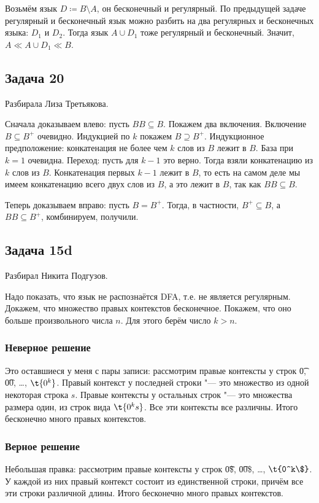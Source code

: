 	Возьмём язык $D \coloneq B \setminus A$, он бесконечный и регулярный.
	По предыдущей задаче регулярный и бесконечный язык можно разбить на два регулярных и бесконечных языка: $D_1$ и $D_2$.
	Тогда язык $A \cup D_1$ тоже регулярный и бесконечный.
	Значит, $A \ll A \cup D_1 \ll B$.

\subsection{Задача 20}
	Разбирала Лиза Третьякова.

	Сначала доказываем влево: пусть $BB\subseteq B$.
	Покажем два включения.
	Включение $B\subseteq B^{+}$ очевидно.
	Индукцией по $k$ покажем $B\supseteq B^{+}$.
	Индукционное предположение: конкатенация не более чем $k$ слов из $B$ лежит в $B$.
	База при $k=1$ очевидна.
	Переход: пусть для $k-1$ это верно.
	Тогда взяли конкатенацию из $k$ слов из $B$.
	Конкатенация первых $k-1$ лежит в $B$, то есть на самом деле мы имеем конкатенацию всего
	двух слов из $B$, а это лежит в $B$, так как $BB\subseteq B$.

	Теперь доказываем вправо: пусть $B=B^{+}$.
	Тогда, в частности, $B^{+} \subseteq B$, а $BB \subseteq B^{+}$, комбинируем, получили.

\subsection{Задача 15d}
	Разбирал Никита Подгузов.

	Надо показать, что язык не распознаётся DFA, т.е. не является регулярным.
	Докажем, что множество правых контекстов бесконечное.
	Покажем, что оно больше произвольного числа $n$.
	Для этого берём число $k>n$.
	\subsubsection{Неверное решение}
		Это оставшиеся у меня с пары записи:
		рассмотрим правые контексты у строк \t{0}, \t{00}, \dots, $\t{0^k}$.
		Правый контекст у последней строки "--- это множество из одной некоторая строка $s$.
		Правые контексты у остальных строк "--- это множества размера один, из строк вида $\t{0^ks}$.
		Все эти контексты все различны.
		Итого бесконечно много правых контекстов.

	\subsubsection{Верное решение}
		Небольшая правка:
		рассмотрим правые контексты у строк \t{0\$}, \t{00\$}, \dots, $\t{0^k\$}$.
		У каждой из них правый контекст состоит из единственной строки, причём все
		эти строки различной длины.
		Итого бесконечно много правых контекстов.

